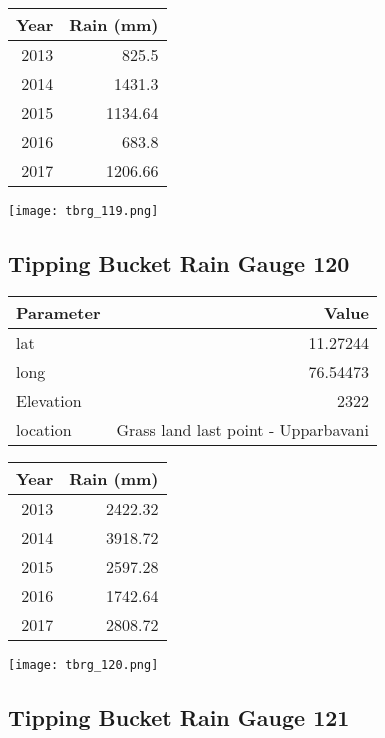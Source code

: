 \documentclass[a4paper]{article}
\begin{document}
\begin{center}
\begin{tabular}{rr}
Year & Rain (mm)\\
\hline
2013 & 825.5\\
2014 & 1431.3\\
2015 & 1134.64\\
2016 & 683.8\\
2017 & 1206.66\\
\end{tabular}
\end{center}

\begin{center}
\texttt{[image: tbrg\_119.png]}
\end{center}


\newpage

\subsection*{Tipping Bucket Rain Gauge 120}
\label{sec:orgbc6144d}

\begin{center}
\begin{tabular}{lr}
Parameter & Value\\
\hline
lat & 11.27244\\
long & 76.54473\\
Elevation & 2322\\
location & Grass land last point - Upparbavani\\
\end{tabular}
\end{center}

\begin{center}
\begin{tabular}{rr}
Year & Rain (mm)\\
\hline
2013 & 2422.32\\
2014 & 3918.72\\
2015 & 2597.28\\
2016 & 1742.64\\
2017 & 2808.72\\
\end{tabular}
\end{center}

\begin{center}
\texttt{[image: tbrg\_120.png]}
\end{center}

\newpage

\subsection*{Tipping Bucket Rain Gauge 121}
\label{sec:orged451bd}
\end{document}
